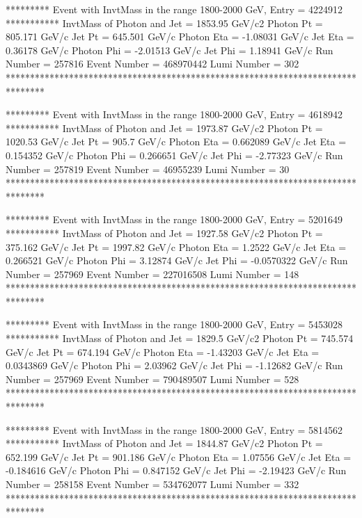                                                                      
********* Event with InvtMass in the range 1800-2000 GeV, Entry = 4224912 ***********
InvtMass of Photon and Jet = 1853.95 GeV/c2
Photon Pt = 805.171 GeV/c
Jet Pt = 645.501 GeV/c
Photon Eta = -1.08031 GeV/c
Jet Eta = 0.36178 GeV/c
Photon Phi = -2.01513 GeV/c
Jet Phi = 1.18941 GeV/c
Run Number = 257816
Event Number = 468970442
Lumi Number = 302
********************************************************************************
                                                                     
                                                                     
********* Event with InvtMass in the range 1800-2000 GeV, Entry = 4618942 ***********
InvtMass of Photon and Jet = 1973.87 GeV/c2
Photon Pt = 1020.53 GeV/c
Jet Pt = 905.7 GeV/c
Photon Eta = 0.662089 GeV/c
Jet Eta = 0.154352 GeV/c
Photon Phi = 0.266651 GeV/c
Jet Phi = -2.77323 GeV/c
Run Number = 257819
Event Number = 46955239
Lumi Number = 30
********************************************************************************
                                                                     
                                                                     
********* Event with InvtMass in the range 1800-2000 GeV, Entry = 5201649 ***********
InvtMass of Photon and Jet = 1927.58 GeV/c2
Photon Pt = 375.162 GeV/c
Jet Pt = 1997.82 GeV/c
Photon Eta = 1.2522 GeV/c
Jet Eta = 0.266521 GeV/c
Photon Phi = 3.12874 GeV/c
Jet Phi = -0.0570322 GeV/c
Run Number = 257969
Event Number = 227016508
Lumi Number = 148
********************************************************************************
                                                                     
                                                                     
********* Event with InvtMass in the range 1800-2000 GeV, Entry = 5453028 ***********
InvtMass of Photon and Jet = 1829.5 GeV/c2
Photon Pt = 745.574 GeV/c
Jet Pt = 674.194 GeV/c
Photon Eta = -1.43203 GeV/c
Jet Eta = 0.0343869 GeV/c
Photon Phi = 2.03962 GeV/c
Jet Phi = -1.12682 GeV/c
Run Number = 257969
Event Number = 790489507
Lumi Number = 528
********************************************************************************
                                                                     
                                                                     
********* Event with InvtMass in the range 1800-2000 GeV, Entry = 5814562 ***********
InvtMass of Photon and Jet = 1844.87 GeV/c2
Photon Pt = 652.199 GeV/c
Jet Pt = 901.186 GeV/c
Photon Eta = 1.07556 GeV/c
Jet Eta = -0.184616 GeV/c
Photon Phi = 0.847152 GeV/c
Jet Phi = -2.19423 GeV/c
Run Number = 258158
Event Number = 534762077
Lumi Number = 332
********************************************************************************
                                                                     
